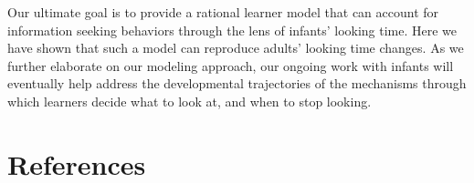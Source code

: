 \documentclass[10pt, letterpaper]{article}
\begin{document}
Our ultimate goal is to provide a rational learner model that can
account for information seeking behaviors through the lens of infants'
looking time. Here we have shown that such a model can reproduce adults'
looking time changes. As we further elaborate on our modeling approach,
our ongoing work with infants will eventually help address the
developmental trajectories of the mechanisms through which learners
decide what to look at, and when to stop looking.

\hypertarget{references}{%
\section{References}\label{references}}

\setlength{\parindent}{-0.1in} 
\setlength{\leftskip}{0.125in}

\noindent
\end{document}

